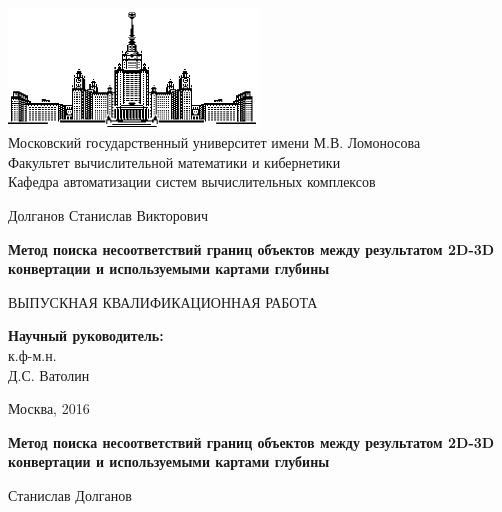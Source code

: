 \documentclass[14pt, a4paper]{extarticle}
\begin{document}
\thispagestyle{empty}

\begin{center}
\ \vspace{-4cm}

\includegraphics[width=0.5\textwidth]{msu}\\
{Московский государственный университет имени М.В. Ломоносова}\\
Факультет вычислительной математики и кибернетики\\
Кафедра автоматизации систем вычислительных комплексов

\vspace{5cm}

{\Large Долганов Станислав Викторович}

\vspace{1cm}

{\Large\bfseries
Метод поиска несоответствий границ объектов между результатом 2D-3D конвертации 
и используемыми картами глубины\\}

\vspace{1cm}

{\large ВЫПУСКНАЯ КВАЛИФИКАЦИОННАЯ  РАБОТА}
\end{center}

\vfill

\begin{flushright}
  \textbf{Научный руководитель:}\\
  к.ф-м.н.\\
  Д.С. Ватолин
\end{flushright}

\vfill

\begin{center}
Москва, 2016
\end{center}

\enlargethispage{4\baselineskip}

\newpage

\textbf{Метод поиска несоответствий границ объектов между результатом 2D-3D конвертации 
и используемыми картами глубины}

\vspace{0.5cm}
Станислав Долганов
\vspace{0.5cm}
\end{document}
